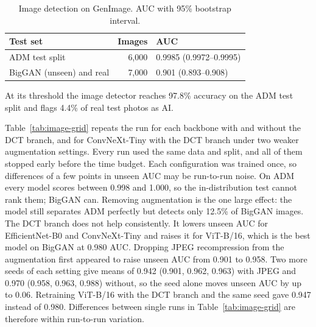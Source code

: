 \documentclass[conference]{IEEEtran}
\begin{document}
\begin{table}[t]
\centering
\caption{Image detection on GenImage. AUC with 95\% bootstrap interval.}
\label{tab:image}
\begin{tabular}{lrl}
\toprule
\textbf{Test set} & \textbf{Images} & \textbf{AUC} \\
\midrule
ADM test split & 6,000 & 0.9985 (0.9972--0.9995) \\
BigGAN (unseen) and real & 7,000 & 0.901 (0.893--0.908) \\
\bottomrule
\end{tabular}
\end{table}

At its threshold the image detector reaches 97.8\% accuracy on the ADM test split and flags 4.4\% of real test photos as AI.

Table~\ref{tab:image-grid} repeats the run for each backbone with and without the DCT branch, and for ConvNeXt-Tiny with the DCT branch under two weaker augmentation settings. Every run used the same data and split, and all of them stopped early before the time budget. Each configuration was trained once, so differences of a few points in unseen AUC may be run-to-run noise. On ADM every model scores between 0.998 and 1.000, so the in-distribution test cannot rank them; BigGAN can. Removing augmentation is the one large effect: the model still separates ADM perfectly but detects only 12.5\% of BigGAN images. The DCT branch does not help consistently. It lowers unseen AUC for EfficientNet-B0 and ConvNeXt-Tiny and raises it for ViT-B/16, which is the best model on BigGAN at 0.980 AUC. Dropping JPEG recompression from the augmentation first appeared to raise unseen AUC from 0.901 to 0.958. Two more seeds of each setting give means of 0.942 (0.901, 0.962, 0.963) with JPEG and 0.970 (0.958, 0.963, 0.988) without, so the seed alone moves unseen AUC by up to 0.06. Retraining ViT-B/16 with the DCT branch and the same seed gave 0.947 instead of 0.980. Differences between single runs in Table~\ref{tab:image-grid} are therefore within run-to-run variation.
\end{document}
